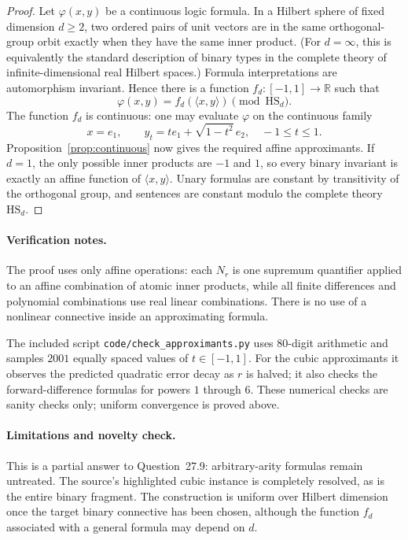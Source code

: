 \documentclass[11pt]{article}
\newcommand{\ip}[2]{\langle #1,#2\rangle}
\newcommand{\HS}{\mathrm{HS}}
\begin{document}
\begin{proof}
Let $\varphi(x,y)$ be a continuous logic formula.  In a Hilbert sphere of
fixed dimension $d\geq2$, two ordered pairs of unit vectors are in the same
orthogonal-group orbit exactly when they have the same inner product.
(For $d=\infty$, this is equivalently the standard description of binary
types in the complete theory of infinite-dimensional real Hilbert spaces.)
Formula interpretations are automorphism invariant.  Hence there is a
function $f_d:[-1,1]\to\mathbb R$ such that
\[
 \varphi(x,y)=f_d(\ip{x}{y})\pmod{\HS_d}.
\]
The function $f_d$ is continuous: one may evaluate $\varphi$ on the
continuous family
\[
 x=e_1,\qquad y_t=te_1+\sqrt{1-t^2}\,e_2,
 \quad -1\leq t\leq1.
\]
Proposition~\ref{prop:continuous} now gives the required affine
approximants.  If $d=1$, the only possible inner products are $-1$ and $1$,
so every binary invariant is exactly an affine function of $\ip{x}{y}$.
Unary formulas are constant by transitivity of the orthogonal group, and
sentences are constant modulo the complete theory $\HS_d$.
\end{proof}

\paragraph{Verification notes.}
The proof uses only affine operations: each $N_r$ is one supremum quantifier
applied to an affine combination of atomic inner products, while all finite
differences and polynomial combinations use real linear combinations.  There
is no use of a nonlinear connective inside an approximating formula.

The included script \texttt{code/check\_approximants.py} uses 80-digit
arithmetic and samples $2001$ equally spaced values of $t\in[-1,1]$.  For the cubic approximants it
observes the predicted quadratic error decay as $r$ is halved; it also checks
the forward-difference formulas for powers $1$ through $6$.  These numerical
checks are sanity checks only; uniform convergence is proved above.

\paragraph{Limitations and novelty check.}
This is a partial answer to Question~27.9: arbitrary-arity formulas remain
untreated.  The source's highlighted cubic instance is completely resolved,
as is the entire binary fragment.  The construction is uniform over Hilbert
dimension once the target binary connective has been chosen, although the
function $f_d$ associated with a general formula may depend on $d$.
\end{document}
